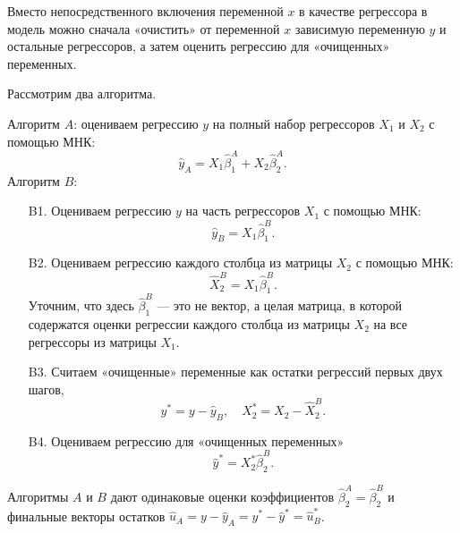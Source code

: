 \documentclass[12pt]{article}
\newcommand{\hb}{\hat{\beta}}
\newcommand{\hu}{\hat{u}}
\newcommand{\hy}{\hat{y}}
\begin{document}
Вместо непосредственного включения переменной $x$ в качестве регрессора в модель можно сначала «очистить» от переменной $x$ зависимую переменную $y$ и остальные регрессоров,
а затем оценить регрессию для «очищенных» переменных.


\begin{theorem}

Рассмотрим два алгоритма. 

Алгоритм $A$: оцениваем регрессию $y$ на полный набор регрессоров $X_1$ и $X_2$ с помощью МНК:
\[
\hy_A = X_1 \hb_1^A  + X_2 \hb_2^A.
\]
Алгоритм $B$: 
\begin{enumerate}
    \item[B1.] Оцениваем регрессию $y$ на часть регрессоров $X_1$ с помощью МНК:
    \[
    \hy_{B} = X_1 \hb_1^{B}.
    \]
    \item[B2.] Оцениваем регрессию каждого столбца из матрицы $X_2$ с помощью МНК:
    \[
    \hat X_2^{B} = X_1 \hb_1^{B}.
    \]
    Уточним, что здесь $\hb_1^B$ — это не вектор, а целая матрица, в которой содержатся оценки регрессии каждого столбца из матрицы $X_2$ на все регрессоры из матрицы $X_1$.
    \item[B3.] Считаем «очищенные» переменные как остатки регрессий первых двух шагов,
    \[
    y^* = y - \hy_B, \quad X_2^* = X_2 - \hat X_2^B.
    \]
    \item[B4.] Оцениваем регрессию для «очищенных переменных»
    \[
    \hy^* = X_2^*\hb_2^B.
    \]
\end{enumerate}

Алгоритмы $A$ и $B$ дают одинаковые оценки коэффициентов $\hb_2^A = \hb_2^B$ и финальные векторы остатков $\hu_A = y - \hy_A = y^* - \hy^* = \hu^*_B$.
\end{theorem}
\end{document}
